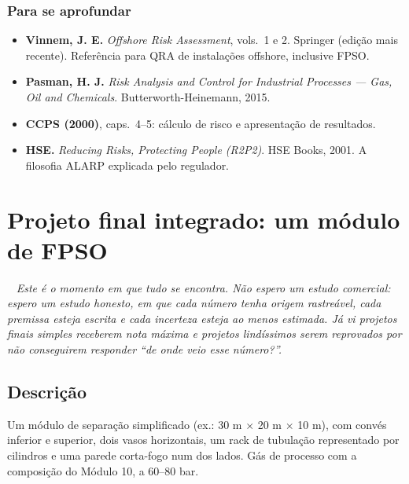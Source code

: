 \documentclass[10pt,a4paper,twocolumn,openany]{report}
\newcommand{\lead}[2]{\par\medskip\noindent{\color{#1}\bfseries #2}\ }
\newenvironment{professor}{\lead{laranja}{Nota do professor.}\itshape}{\par\medskip}
\newenvironment{aprofundar}{\subsection*{\textcolor{amarelo}{Para se aprofundar}}\small}{\par}
\begin{document}
\begin{aprofundar}
\begin{itemize}[leftmargin=*]
  \item \textbf{Vinnem, J. E.} \emph{Offshore Risk Assessment}, vols.\ 1 e 2. Springer (edição mais recente). Referência para QRA de instalações offshore, inclusive FPSO.
  \item \textbf{Pasman, H. J.} \emph{Risk Analysis and Control for Industrial Processes --- Gas, Oil and Chemicals}. Butterworth-Heinemann, 2015.
  \item \textbf{CCPS (2000)}, caps.\ 4--5: cálculo de risco e apresentação de resultados.
  \item \textbf{HSE.} \emph{Reducing Risks, Protecting People (R2P2)}. HSE Books, 2001. A filosofia ALARP explicada pelo regulador.
\end{itemize}
\end{aprofundar}

\chapter{Projeto final integrado: um módulo de FPSO}

\begin{professor}
Este é o momento em que tudo se encontra. Não espero um estudo
comercial: espero um estudo \emph{honesto}, em que cada número tenha origem
rastreável, cada premissa esteja escrita e cada incerteza esteja ao menos
estimada. Já vi projetos finais simples receberem nota máxima e projetos
lindíssimos serem reprovados por não conseguirem responder ``de onde veio
esse número?''.
\end{professor}

\section*{Descrição}
Um módulo de separação simplificado (ex.: 30 m $\times$ 20 m $\times$ 10 m),
com convés inferior e superior, dois vasos horizontais, um rack de tubulação
representado por cilindros e uma parede corta-fogo num dos lados. Gás de
processo com a composição do Módulo 10, a 60--80 bar.
\end{document}
